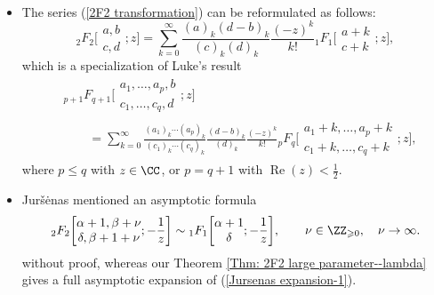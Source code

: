 \begin{Remark}
	~
	\begin{itemize}\itemsep=0pt
		\item[(1)] The series (\ref{2F2 transformation}) can be reformulated as follows:
		\begin{equation}\label{2F2 transformation reformulated}
			{}_2F_2\biggl[\begin{matrix}
				a,b\\
				c,d
			\end{matrix};z\biggr]=\sum_{k=0}^{\infty}\frac{(a)_k(d-b)_k}{(c)_k(d)_k}\frac{(-z)^k}{k!}{}_1F_1\biggl[\begin{matrix}
				a+k\\
				c+k
			\end{matrix};z\biggr],
		\end{equation}
		which is a specialization of Luke's result \cite[Section~9.1, equation~(34)]{Luke-1969}
		\begin{align}
					&{}_{p+1}F_{q+1}\biggl[\begin{matrix}
						a_1,\dots,a_p,b\\
						c_1,\dots,c_q,d
					\end{matrix};z\biggr]{}\nonumber\\
 & \qquad{}= \sum_{k=0}^{\infty}\frac{ (a_1 )_k\cdots (a_p )_k}{ (c_1 )_k\cdots (c_q )_k}\frac{(d-b)_k}{(d)_k}
 \frac{(-z)^k}{k!}{}_{p}F_{q}\biggl[\begin{matrix}
						a_1+k,\dots,a_p+k\\
						c_1+k,\dots,c_q+k
					\end{matrix};z\biggr],\label{pFp transformation}
\end{align}
			where $p\leqslant q$ with $z\in\CC$, or $p=q+1$ with $\operatorname{Re}(z)<\frac{1}{2}$.
		
		\item[(2)] Jur\v{s}\.enas \cite[Section~4.1, p.~69]{Jursenas-2014} mentioned an asymptotic formula
		\begin{equation}\label{Jursenas expansion-1}
			{}_2F_2\biggl[\begin{matrix}
				\alpha+1,\beta+\nu\\
				\delta,\beta+1+\nu
			\end{matrix};-\frac{1}{z}\biggr]\sim {}_1F_1\biggl[\begin{matrix}
				\alpha+1\\
				\delta
			\end{matrix};-\frac{1}{z}\biggr],\qquad \nu\in\ZZ_{\geqslant 0},\quad\nu\to \infty.
		\end{equation}
		without proof, whereas our Theorem \ref{Thm: 2F2 large parameter--lambda} gives a full asymptotic expansion of (\ref{Jursenas expansion-1}).
	\end{itemize}
\end{Remark}

